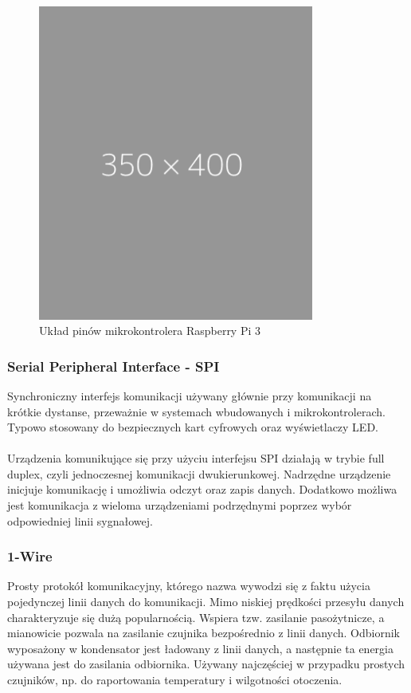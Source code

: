 \documentclass[12pt]{report}
\let\Oldsubsubsection\subsubsection
\renewcommand{\subsubsection}{\FloatBarrier\Oldsubsubsection}
\begin{document}
{\begin{figure}[h]
	\centering
	\includegraphics[width=0.81\textwidth]{images/placeholder.png}
	\caption{Układ pinów mikrokontrolera Raspberry Pi 3}
\end{figure}

\subsubsection{Serial Peripheral Interface - SPI}
Synchroniczny interfejs komunikacji używany głównie przy komunikacji na krótkie dystanse, przeważnie w systemach wbudowanych i mikrokontrolerach. Typowo stosowany do bezpiecznych kart cyfrowych oraz wyświetlaczy LED. \\ \\
Urządzenia komunikujące się przy użyciu interfejsu SPI działają w trybie full duplex, czyli jednoczesnej komunikacji dwukierunkowej. Nadrzędne urządzenie inicjuje komunikację i umożliwia odczyt oraz zapis danych. Dodatkowo możliwa jest komunikacja z wieloma urządzeniami podrzędnymi poprzez wybór odpowiedniej linii sygnałowej.

\subsubsection{1-Wire}
Prosty protokół komunikacyjny, którego nazwa wywodzi się z faktu użycia pojedynczej linii danych do komunikacji. Mimo niskiej prędkości przesyłu danych charakteryzuje się dużą popularnością. Wspiera tzw. zasilanie pasożytnicze, a mianowicie pozwala na zasilanie czujnika bezpośrednio z linii danych. Odbiornik wyposażony w kondensator jest ładowany z linii danych, a następnie ta energia używana jest do zasilania odbiornika. Używany najczęściej w przypadku prostych czujników, np. do raportowania temperatury i wilgotności otoczenia.

}
\end{document}
